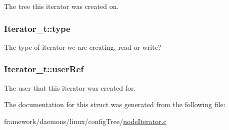 The tree this iterator was created on. 

\subsubsection[{\texorpdfstring{type}{type}}]{ Iterator\+\_\+t\+::type}\hypertarget{struct_iterator__t_a4daa7b32dfc42c0a622fd24a16672225}{}\label{struct_iterator__t_a4daa7b32dfc42c0a622fd24a16672225}


The type of iterator we are creating, read or write? 

\subsubsection[{\texorpdfstring{user\+Ref}{userRef}}]{ Iterator\+\_\+t\+::user\+Ref}\hypertarget{struct_iterator__t_a5d5da27f6b619365c158b865c0384a96}{}\label{struct_iterator__t_a5d5da27f6b619365c158b865c0384a96}


The user that this iterator was created for. 



The documentation for this struct was generated from the following file\+:\begin{DoxyCompactItemize}
\item 
framework/daemons/linux/config\+Tree/\hyperlink{node_iterator_8c}{node\+Iterator.\+c}\end{DoxyCompactItemize}
